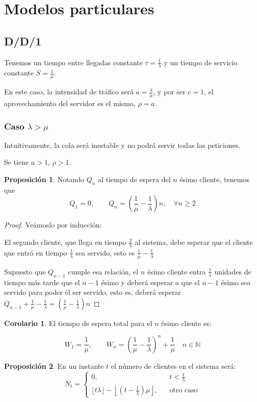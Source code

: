 \documentclass[a4paper,10pt]{scrartcl}
\theoremstyle{definition}
\newtheorem*{fact*}{Proposición}
\newtheorem*{corollary*}{Corolario}
\numberwithin{equation}{section}
\begin{document}
\section{Modelos particulares}
\subsection{D/D/1}
Tenemos un tiempo entre llegadas constante $\tau = \frac{1}{\lambda}$ y un tiempo de servicio constante $S = \frac{1}{\mu}$.

En este caso, la intensidad de tráfico será $a=\frac{\lambda}{\mu}$, y por ser $c = 1$, el aprovechamiento del servidor es el mismo, $\rho = a$.

\subsubsection{Caso $\lambda > \mu$}
Intuitivamente, la cola será inestable y no podrá servir todas las peticiones. 

Se tiene $a > 1$, $\rho > 1$.

\begin{fact*}
Notando $Q_n$ al tiempo de espera del $n$ ésimo cliente, tenemos que \[Q_1 = 0, \qquad Q_n = \left(\frac{1}{\mu} - \frac{1}{\lambda}\right)n, \quad \forall n\ge 2\]
\end{fact*}

\begin{proof}
Veámoslo por inducción:

El segundo cliente, que llega en tiempo $\frac{2}{\lambda}$ al sistema, debe esperar que el cliente que entró en tiempo $\frac{1}{\lambda}$ sea servido,
esto es $\frac{1}{\mu} - \frac{1}{\lambda}$

Supuesto que $Q_{n-1}$ cumple esa relación, el $n$ ésimo cliente entra $\frac{1}{\lambda}$ unidades de tiempo
más tarde que el $n-1$ ésimo y deberá esperar a que el $n-1$ ésimo sea servido para poder él ser servido, esto es,
deberá esperar $Q_{n-1} + \frac{1}{\mu} - \frac{1}{\lambda} = \left(\frac{1}{\mu} - \frac{1}{\lambda}\right)n$
\end{proof}

\begin{corollary*}
 El tiempo de espera total para el $n$ ésimo cliente es:
 
 \[W_1 = \frac{1}{\mu}, \qquad W_n = \left(\frac{1}{\mu} - \frac{1}{\lambda}\right)^n + \frac{1}{\mu} \quad n\in \mathbb{N}\]
\end{corollary*}

\begin{fact*}
 En un instante $t$ el número de clientes en el sistema será: 
 \[N_t = \left\{\begin{array}{lcc}
         0, && t < \frac{1}{\lambda}\\
         \lfloor t\lambda \rfloor - \left\lfloor\left(t-\frac{1}{\lambda}\right)\mu\right\rfloor, && \text{otro caso}
         \end{array}\right.\]
\end{fact*}
\end{document}
